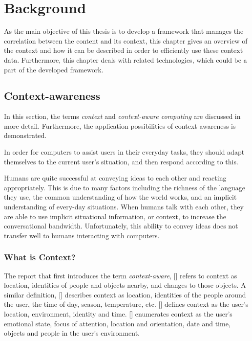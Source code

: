 \chapter{Background\label{cha:chapter2}}
As the main objective of this thesis is to develop a framework that manages the correlation between the content and its context, this chapter gives an overview of the context and how it can be described in order to efficiently use these context data. Furthermore, this chapter deals with related technologies, which could be a part of the developed framework.

\section{Context-awareness\label{sec:back_con_aw}}
In this section, the terms \textit{context} and \textit{context-aware computing} are discussed in more detail. Furthermore, the application possibilities of context awareness is demonstrated.

In order for computers to assist users in their everyday tasks, they should adapt themselves to the current user's situation, and then respond according to this. 

Humans are quite successful at conveying ideas to each other and reacting appropriately. This is due to many factors including the richness of the language they use, the common understanding of how the world works, and an implicit understanding of every-day situations. When humans talk with each other, they are able to use implicit situational information, or context, to increase the conversational bandwidth. Unfortunately, this ability to convey ideas does not transfer well to humans interacting with computers.\citeauthor{Dey2000b}

\subsection{What is Context?}

The report that first introduces the term \emph{context-aware}, [\citeauthor{ieee313011}] refers to context as location, identities of people and objects nearby, and changes to those objects. A similar definition, [\citeauthor{ieee626984}] describes context as location, identities of the people around the user, the time of day, season, temperature, etc. [\citeauthor{Ryan97}] defines context as the user's location, environment, identity and time. [\citeauthor{Dey98}] enumerates context as the user's emotional state, focus of attention, location and orientation, date and time, objects and people in the user's environment. %

